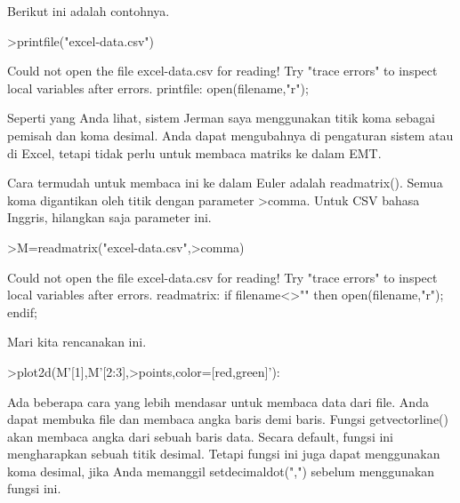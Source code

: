 \documentclass[a4paper,10pt]{article}
\begin{document}
\begin{eulernotebook}
\begin{eulercomment}
\begin{eulercomment}
\begin{eulercomment}
\begin{eulercomment}
\begin{eulercomment}
\begin{eulercomment}
\begin{eulercomment}
Berikut ini adalah contohnya.
\end{eulercomment}
\begin{eulerprompt}
>printfile("excel-data.csv")
\end{eulerprompt}
\begin{euleroutput}
  Could not open the file
  excel-data.csv
  for reading!
  Try "trace errors" to inspect local variables after errors.
  printfile:
      open(filename,"r");
\end{euleroutput}
\begin{eulercomment}
Seperti yang Anda lihat, sistem Jerman saya menggunakan titik koma
sebagai pemisah dan koma desimal. Anda dapat mengubahnya di pengaturan
sistem atau di Excel, tetapi tidak perlu untuk membaca matriks ke
dalam EMT.

Cara termudah untuk membaca ini ke dalam Euler adalah readmatrix().
Semua koma digantikan oleh titik dengan parameter \textgreater{}comma. Untuk CSV
bahasa Inggris, hilangkan saja parameter ini.
\end{eulercomment}
\begin{eulerprompt}
>M=readmatrix("excel-data.csv",>comma)
\end{eulerprompt}
\begin{euleroutput}
  Could not open the file
  excel-data.csv
  for reading!
  Try "trace errors" to inspect local variables after errors.
  readmatrix:
      if filename<>"" then open(filename,"r"); endif;
\end{euleroutput}
\begin{eulercomment}
Mari kita rencanakan ini.
\end{eulercomment}
\begin{eulerprompt}
>plot2d(M'[1],M'[2:3],>points,color=[red,green]'):
\end{eulerprompt}
\begin{eulercomment}
Ada beberapa cara yang lebih mendasar untuk membaca data dari file.
Anda dapat membuka file dan membaca angka baris demi baris. Fungsi
getvectorline() akan membaca angka dari sebuah baris data. Secara
default, fungsi ini mengharapkan sebuah titik desimal. Tetapi fungsi
ini juga dapat menggunakan koma desimal, jika Anda memanggil
setdecimaldot(",") sebelum menggunakan fungsi ini.


\end{eulercomment}
\end{eulercomment}
\end{eulercomment}
\end{eulercomment}
\end{eulercomment}
\end{eulercomment}
\end{eulercomment}
\end{eulernotebook}
\end{document}
